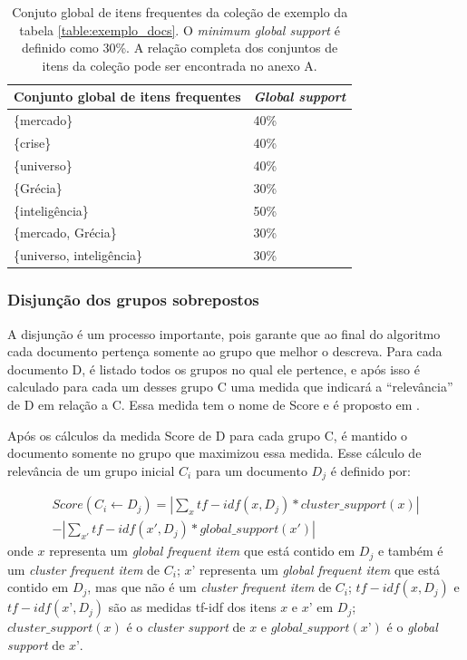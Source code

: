 \documentclass[a4paper,12pt]{article}
\begin{document}
\begin{table}[h]
\centering
\begin{tabular}{ | l | l | }
\hline
Conjunto global de itens frequentes & \textit{Global support} \\ \hline
\{mercado\}                         & 40\% \\ \hline
\{crise\}                               & 40\% \\ \hline
\{universo\}                         & 40\% \\ \hline
\{Grécia\}                             & 30\% \\ \hline
\{inteligência\}                     & 50\% \\ \hline
\{mercado, Grécia\}             & 30\% \\ \hline
\{universo, inteligência\}     & 30\% \\
\hline
\end{tabular}
\caption{Conjuto global de itens frequentes da coleção de exemplo da tabela \ref{table:exemplo_docs}. O \textit{minimum global support} é definido como 30\%. A relação completa dos conjuntos de itens da coleção pode ser encontrada no anexo A.}
\label{table:conjunto_itens_frequentes}
\end{table}

\subsubsection {Disjunção dos grupos sobrepostos}
\label {sec:disjuncao_grupos_sobrepostos}

A disjunção é um processo importante, pois garante que ao final do algoritmo cada documento pertença somente ao grupo que melhor o descreva. Para cada documento D, é listado todos os grupos no qual ele pertence, e após isso é calculado para cada um desses grupo C uma medida que indicará a “relevância” de D em relação a C. Essa medida tem o nome de Score e é proposto em \cite{Ester03}.

Após os cálculos da medida Score de D para cada grupo C, é mantido o documento somente no grupo que maximizou essa medida. Esse cálculo de relevância de um grupo inicial $C_{i}$ para um documento $D_{j}$ é definido por:

\begin{equation}
\begin{split}
  Score(C_{i} \gets D_{j}) = |\sum_{x}tf-idf(x, D_{j}) * cluster\_support(x)| \\
  - |\sum_{x'}tf-idf(x', D_{j}) * global\_support(x')|
\end{split}
\end{equation}
onde $x$ representa um \textit{global frequent item} que está contido em $D_{j}$ e também é um \textit{cluster frequent item} de $C_{i}$; $x’$ representa um \textit{global frequent item} que está contido em $D_{j}$, mas que não é um \textit{cluster frequent item} de $C_{i}$; $tf-idf(x, D_{j})$ e $tf-idf(x’, D_{j})$ são as medidas tf-idf dos itens $x$ e $x’$ em $D_{j}$; $cluster\_support(x)$ é o \textit{cluster support} de $x$ e $global\_support(x’)$ é o \textit{global support} de $x’$.
\end{document}
